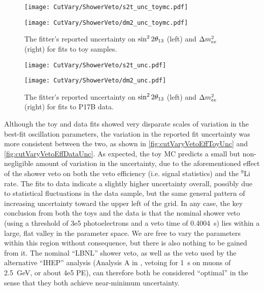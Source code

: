 \documentclass[../thesis.tex]{subfiles}
\begin{document}
\begin{figure}[ht]
  \begin{minipage}{0.5\linewidth}%
    \texttt{[image: CutVary/ShowerVeto/s2t\_unc\_toymc.pdf]}%
  \end{minipage}%
  \begin{minipage}{0.5\linewidth}%
    \texttt{[image: CutVary/ShowerVeto/dm2\_unc\_toymc.pdf]}%
  \end{minipage}%
  \caption{The fitter's reported uncertainty on $\sin^2 2\theta_{13}$ (left) and $\Delta m^2_{ee}$ (right) for fits to toy samples.}
  \label{fig:cutVaryVetoEffToyUnc}
\end{figure}

\begin{figure}[ht]
  \begin{minipage}{0.5\linewidth}%
    \texttt{[image: CutVary/ShowerVeto/s2t\_unc.pdf]}%
  \end{minipage}%
  \begin{minipage}{0.5\linewidth}%
    \texttt{[image: CutVary/ShowerVeto/dm2\_unc.pdf]}%
  \end{minipage}%
  \caption{The fitter's reported uncertainty on $\sin^2 2\theta_{13}$ (left) and $\Delta m^2_{ee}$ (right) for fits to P17B data.}
  \label{fig:cutVaryVetoEffDataUnc}
\end{figure}

Although the toy and data fits showed very disparate scales of variation in the best-fit oscillation parameters, the variation in the reported fit uncertainty was more consistent between the two, as shown in \autoref{fig:cutVaryVetoEffToyUnc} and \autoref{fig:cutVaryVetoEffDataUnc}. As expected, the toy MC predicts a small but non-negligible amount of variation in the uncertainty, due to the aforementioned effect of the shower veto on both the veto efficiency (i.e. signal statistics) and the $^9$Li rate. The fits to data indicate a slightly higher uncertainty overall, possibly due to statistical fluctuations in the data sample, but the same general pattern of increasing uncertainty toward the upper left of the grid. In any case, the key conclusion from both the toys and the data is that the nominal shower veto (using a threshold of 3e5 photoelectrons and a veto time of 0.4004~s) lies within a large, flat valley in the parameter space. We are free to vary the parameters within this region without consequence, but there is also nothing to be gained from it. The nominal ``LBNL'' shower veto, as well as the veto used by the alternative ``IHEP'' analysis (Analysis A in \cite{An_2017}, vetoing for 1~s on muons of 2.5~GeV, or about 4e5 PE), can therefore both be considered ``optimal'' in the sense that they both achieve near-minimum uncertainty.
\end{document}
